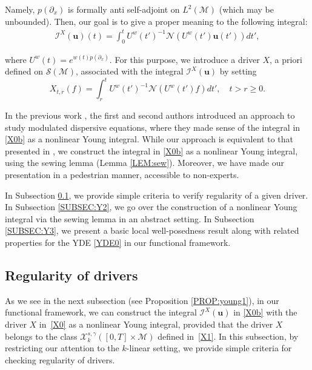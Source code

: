 \documentclass[letterpaper, 11pt,  reqno]{amsart}
\newcommand{\1}{\hspace{0.5mm}\text{I}\hspace{0.5mm}}
\newcommand{\I}{\mathcal{I}}
\newcommand{\noi}{\noindent}
\newcommand{\g}{\gamma}
\newcommand{\dx}{\partial_x}
\renewcommand{\S}{\mathcal{S}}
\newcommand{\M}{\mathcal{M}}
\newcommand{\NN}{\mathcal{N}}
\newcommand{\cX}{\mathcal{X}}
\newcommand{\uw}{U^w}
\newcommand{\uu}{\mathbf{u}}
\numberwithin{equation}{section}
\numberwithin{theorem}{section}
\begin{document}
\noi
Namely, $p(\dx)$ is formally anti self-adjoint on $L^2(\M)$
(which may be unbounded).
Then, our goal is to give a proper meaning to 
the following integral:
\begin{align}
\label{X0b}
\I^X(\uu)(t) = 
 \int_0^t \uw(t')^{-1}\NN(\uw(t') \uu(t'))dt' , 
\end{align}



\noi
where $U^w(t) = e^{ w(t)p(\dx)}$.
For this purpose, we
introduce a driver $X$, a priori defined on $\S(\M)$,  associated with the integral $\I^X(\uu)$
by setting 
\begin{equation}
X_{t,r}(f) = \int_r^t \uw(t')^{-1} \NN(\uw(t') f) dt', \quad t >  r \ge 0.
\label{X0}
\end{equation}





In the previous work 
\cite{CG1}, 
the first and second authors introduced 
an approach to study modulated dispersive equations, 
where they made sense of the integral in \eqref{X0b}
as a nonlinear Young integral.
While our approach is equivalent
to that presented in \cite{CG1}, 
we construct the integral in \eqref{X0b}
as a nonlinear Young integral, using the sewing lemma
(Lemma \ref{LEM:sew}).
Moreover, we have made our presentation 
in a pedestrian manner, accessible
to non-experts.






In Subsection \ref{SUBSEC:Y1}, 
we provide simple criteria
to verify regularity of a given driver.
In 
Subsection \ref{SUBSEC:Y2}, 
we go over the construction of 
a nonlinear Young integral 
via the sewing lemma in an abstract setting.
In 
Subsection \ref{SUBSEC:Y3}, 
we present a basic local well-posedness
result
along with related properties
for the YDE \eqref{YDE0}
in our functional framework.





\subsection{Regularity  of drivers}
\label{SUBSEC:Y1}

As we see in the next subsection (see Proposition \ref{PROP:young1}), 
in our functional framework, 
we can construct the integral $\I^X(\uu)$ in \eqref{X0b}
with the driver $X$ in~\eqref{X0}
as a nonlinear Young integral, 
provided that 
the driver $X$ belongs to the class
 $\cX^{s, \g}_k([0, T]\times \M)$ 
 defined in~\eqref{X1}.
In this subsection, by restricting our attention to the $k$-linear setting, 
we provide
 simple criteria
for checking regularity of drivers.
\end{document}
